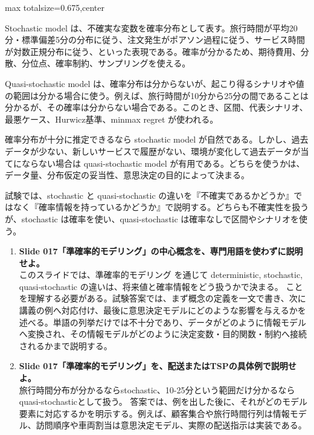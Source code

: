 \begin{adjustbox}{max totalsize={\textwidth}{0.675\textheight},center}
\begin{minipage}{\textwidth}
\begin{minipage}[t]{0.485\textwidth}
Stochastic model は、不確実な変数を確率分布として表す。旅行時間が平均20分・標準偏差5分の分布に従う、注文発生がポアソン過程に従う、サービス時間が対数正規分布に従う、といった表現である。確率が分かるため、期待費用、分散、分位点、確率制約、サンプリングを使える。\par
Quasi-stochastic model は、確率分布は分からないが、起こり得るシナリオや値の範囲は分かる場合に使う。例えば、旅行時間が10分から25分の間であることは分かるが、その確率は分からない場合である。このとき、区間、代表シナリオ、最悪ケース、Hurwicz基準、minmax regret が使われる。\par
確率分布が十分に推定できるなら stochastic model が自然である。しかし、過去データが少ない、新しいサービスで履歴がない、環境が変化して過去データが当てにならない場合は quasi-stochastic model が有用である。どちらを使うかは、データ量、分布仮定の妥当性、意思決定の目的によって決まる。\par
試験では、stochastic と quasi-stochastic の違いを『不確実であるかどうか』ではなく『確率情報を持っているかどうか』で説明する。どちらも不確実性を扱うが、stochastic は確率を使い、quasi-stochastic は確率なしで区間やシナリオを使う。\par
{}
\begin{enumerate}
\item \textbf{Slide 017「準確率的モデリング」の中心概念を、専門用語を使わずに説明せよ。}\\このスライドでは、準確率的モデリング を通じて deterministic, stochastic, quasi-stochastic の違いは、将来値と確率情報をどう扱うかで決まる。 ことを理解する必要がある。試験答案では、まず概念の定義を一文で書き、次に講義の例へ対応付け、最後に意思決定モデルにどのような影響を与えるかを述べる。単語の列挙だけでは不十分であり、データがどのように情報モデルへ変換され、その情報モデルがどのように決定変数・目的関数・制約へ接続されるかまで説明する。
\item \textbf{Slide 017「準確率的モデリング」を、配送またはTSPの具体例で説明せよ。}\\旅行時間分布が分かるならstochastic、10-25分という範囲だけ分かるならquasi-stochasticとして扱う。 答案では、例を出した後に、それがどのモデル要素に対応するかを明示する。例えば、顧客集合や旅行時間行列は情報モデル、訪問順序や車両割当は意思決定モデル、実際の配送指示は実装である。
\end{enumerate}
\end{minipage}
\end{minipage}
\end{adjustbox}

